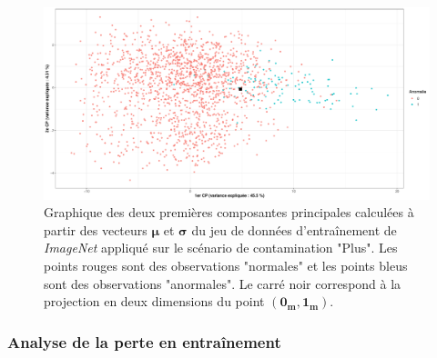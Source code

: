 \begin{figure}[htb]
	\centering
	\centering\includegraphics[width=\linewidth]{images/plot_pca_cars}
	\DIFdelbeginFL %
\DIFdelendFL \DIFaddbeginFL \caption[Graphique des deux premières composantes principales calculées à partir des vecteurs $\boldsymbol{\mu}$ et $\boldsymbol{\sigma}$ du jeu de données d'entraînement de \textit{ImageNet}.]{\DIFaddendFL Graphique des deux premières composantes principales calculées à partir des vecteurs $\boldsymbol{\mu}$ et $\boldsymbol{\sigma}$ du jeu de données d'entraînement de \textit{ImageNet} appliqué sur le scénario de contamination "Plus". Les points rouges sont des observations "normales" et les points bleus sont des observations "anormales". Le carré noir correspond à la projection en deux dimensions du point $(\boldsymbol{0_{m}}, \boldsymbol{1_{m}})$.}
	\label{fig:pca_cars}
\end{figure}


\subsubsection{Analyse de la perte en entraînement}

